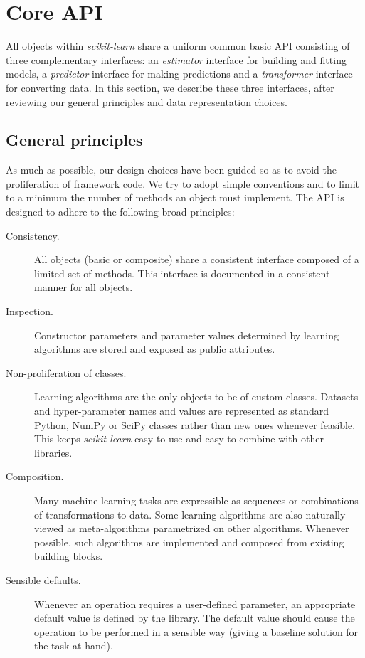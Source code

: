 \documentclass{llncs}
\newcommand{\sklearn}{\textit{scikit-learn}\xspace}
\begin{document}
\section{Core API}

\label{sec:core-api}

All objects within \sklearn share a uniform common basic API consisting of three
complementary interfaces: an \textit{estimator} interface for building and
fitting models, a \textit{predictor} interface for making predictions and a
\textit{transformer} interface for converting data. In this section, we describe
these three interfaces, after reviewing our general principles and data
representation choices.

\subsection{General principles}

As much as possible, our
design choices have been guided so as to avoid the proliferation of framework
code. We try to adopt simple conventions and to limit to a minimum the number of
methods an object must implement. The API is designed to adhere to the following
broad principles:

\begin{description}
  \item[Consistency.]
       All objects (basic or composite) share a consistent interface composed of
       a limited set of methods. This interface is documented in a consistent
       manner for all objects.
  \item[Inspection.]
       Constructor parameters and parameter values determined by learning
       algorithms are stored and exposed as public attributes.
  \item[Non-proliferation of classes.]
       Learning algorithms are the only objects to be of custom classes.
       Datasets and hyper-parameter names and values are represented as standard
       Python, NumPy or SciPy classes rather than new ones whenever feasible.
       This keeps \sklearn easy to use and easy to combine with other libraries.
  \item[Composition.]
       Many machine learning tasks are expressible
       as sequences or combinations of transformations to data.
       Some learning algorithms are also naturally viewed
       as meta-algorithms parametrized on other algorithms.
       Whenever possible, such algorithms are implemented and composed from
       existing building blocks.
  \item[Sensible defaults.]
       Whenever an operation requires a user-defined parameter,
       an appropriate default value is defined by the library.
       The default value should cause the operation to be performed
       in a sensible way (giving a baseline solution for the task at hand).
\end{description}
\end{document}
